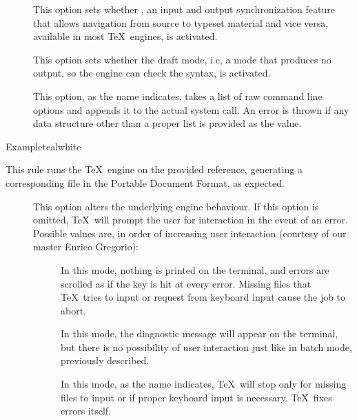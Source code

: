 \begin{description}
\begin{description}
\item[] This option sets whether , an input and output synchronization feature that allows navigation from source to typeset material and vice versa, available in most \TeX\ engines, is activated.

\item[] This option sets whether the draft mode, i.e, a mode that produces no output, so the engine can check the syntax, is activated.

\item[] This option, as the name indicates, takes a list of raw command line options and appends it to the actual system call. An error is thrown if any data structure other than a proper list is provided as the value.
\end{description}

\begin{codebox}{Example}{teal}{\icnote}{white}
\end{codebox}

\item[\rulebox{pdftex}]
This rule runs the  \TeX\ engine on the provided  reference, generating a corresponding file in the Portable Document Format, as expected.

\begin{description}
\item[] This option alters the underlying engine behaviour. If this option is omitted, \TeX\ will prompt the user for interaction in the event of an error. Possible values are, in order of increasing user interaction (courtesy of our master Enrico Gregorio):

\begin{description}
\item[] In this mode, nothing is printed on the terminal, and errors are scrolled as if the  key is hit at every error. Missing files that \TeX\ tries to input or request from keyboard input cause the job to abort.

\item[] In this mode, the diagnostic message will appear on the terminal, but there is no possibility of user interaction just like in batch mode, previously described.

\item[] In this mode, as the name indicates, \TeX\ will stop only for missing files to input or if proper keyboard input is necessary. \TeX\ fixes errors itself.


\end{description}
\end{description}
\end{description}

